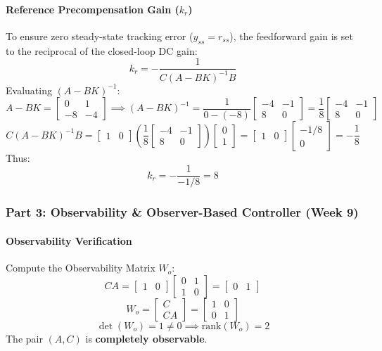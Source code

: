 \documentclass[12pt,onecolumn,twoside ]{article}
\begin{document}
	\paragraph{Reference Precompensation Gain ($k_r$)}
	To ensure zero steady-state tracking error ($y_{ss} = r_{ss}$), the feedforward gain is set to the reciprocal of the closed-loop DC gain: \[
	k_r = -\frac{1}{C(A - BK)^{-1}B}
	\]
	Evaluating $(A - BK)^{-1}$: \[
	A - BK = \begin{bmatrix} 0 & 1 \\ -8 & -4 \end{bmatrix} \implies (A - BK)^{-1} = \frac{1}{0 - (-8)} \begin{bmatrix} -4 & -1 \\ 8 & 0 \end{bmatrix} = \frac{1}{8} \begin{bmatrix} -4 & -1 \\ 8 & 0 \end{bmatrix}
	\] \[
	C(A - BK)^{-1}B = \begin{bmatrix} 1 & 0 \end{bmatrix} \left( \frac{1}{8} \begin{bmatrix} -4 & -1 \\ 8 & 0 \end{bmatrix} \right) \begin{bmatrix} 0 \\ 1 \end{bmatrix} = \begin{bmatrix} 1 & 0 \end{bmatrix} \begin{bmatrix} -1/8 \\ 0 \end{bmatrix} = -\frac{1}{8}
	\]
	Thus: \[
	k_r = -\frac{1}{-1/8} = 8
	\]
	
	\subsubsection{Part 3: Observability \& Observer-Based Controller (Week 9)}
	\paragraph{Observability Verification}
	Compute the Observability Matrix $W_o$: \[
	CA = \begin{bmatrix} 1 & 0 \end{bmatrix} \begin{bmatrix} 0 & 1 \\ 1 & 0 \end{bmatrix} = \begin{bmatrix} 0 & 1 \end{bmatrix}
	\] \[
	W_o = \begin{bmatrix} C \\ CA \end{bmatrix} = \begin{bmatrix} 1 & 0 \\ 0 & 1 \end{bmatrix}
	\]
	\[
	\det(W_o) = 1 \neq 0 \implies \text{rank}(W_o) = 2
	\] The pair $(A, C)$ is \textbf{completely observable}.
\end{document}
